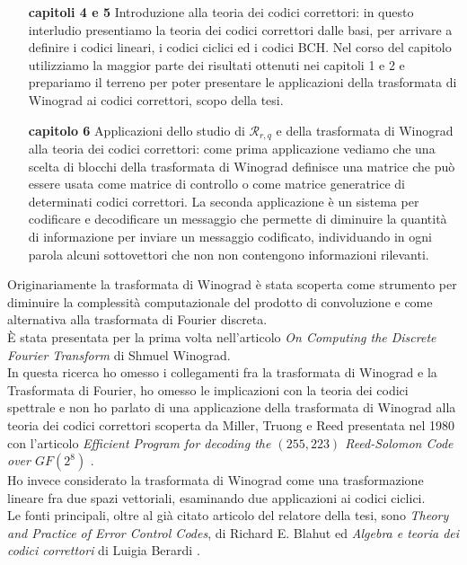 \begin{enumerate}
   \item[{\bf capitoli 4 e 5}] Introduzione alla teoria dei codici correttori: in questo interludio presentiamo la teoria dei codici correttori dalle basi, per arrivare a definire i codici lineari, i codici ciclici ed i codici BCH. Nel corso del capitolo utilizziamo la maggior parte dei risultati ottenuti nei capitoli 1 e 2 e prepariamo il terreno per poter presentare le applicazioni della trasformata di Winograd ai codici correttori, scopo della tesi.
   
   \item[{\bf capitolo 6}] Applicazioni dello studio di $\mathcal{R}_{r,q}$ e della trasformata di Winograd alla teoria dei codici correttori: come prima applicazione vediamo che una scelta di blocchi della trasformata di Winograd definisce una matrice che può essere usata come matrice di controllo o come matrice generatrice di determinati codici correttori. La seconda applicazione è un sistema per codificare e decodificare un messaggio che permette di diminuire la quantità di informazione per inviare un messaggio codificato, individuando in ogni parola alcuni sottovettori che non non contengono informazioni rilevanti. 
\end{enumerate}
\noindent
Originariamente la trasformata di Winograd è stata scoperta come strumento per diminuire la complessità computazionale del prodotto di convoluzione e come alternativa alla trasformata di Fourier discreta. \\
È stata presentata per la prima volta nell'articolo \emph{On Computing the Discrete Fourier Transform} \cite{winograd2} di Shmuel Winograd. \\
In questa ricerca ho omesso i collegamenti fra la trasformata di Winograd e la Trasformata di Fourier, ho omesso le implicazioni con la teoria dei codici spettrale e non ho parlato di una applicazione della trasformata di Winograd alla teoria dei codici correttori scoperta da Miller, Truong e Reed presentata nel 1980 con l'articolo \emph{Efficient Program for decoding the $(255,223)$ Reed-Solomon Code over $GF(2^{8})$} \cite{miller}. \\
Ho invece considerato la trasformata di Winograd come una trasformazione lineare fra due spazi vettoriali, esaminando due applicazioni ai codici ciclici. \\
Le fonti principali, oltre al già citato articolo del relatore della tesi, sono \emph{Theory and Practice of Error Control Codes}, di Richard E. Blahut \cite{blahut} ed \emph{Algebra e teoria dei codici correttori} di Luigia Berardi \cite{berardi}.
%
\newpage
%
